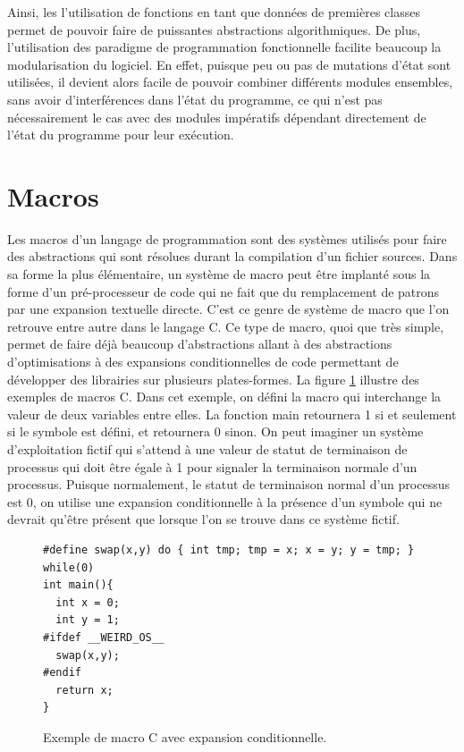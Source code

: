 \documentclass[12pt,oneside,letterpaper,francais]{book}
\newcommand{\scheme}[1]{\selectlanguage{english}{\tt #1}\selectlanguage{french}}
\begin{document}
Ainsi, les l'utilisation de fonctions en tant que données de premières
classes permet de pouvoir faire de puissantes abstractions
algorithmiques. De plus, l'utilisation des paradigme de programmation
fonctionnelle facilite beaucoup la modularisation du logiciel. En
effet, puisque peu ou pas de mutations d'état sont utilisées, il
devient alors facile de pouvoir combiner différents modules ensembles,
sans avoir d'interférences dans l'état du programme, ce qui n'est pas
nécessairement le cas avec des modules impératifs dépendant
directement de l'état du programme pour leur exécution.


\section{Macros}
\label{Scheme:macros}

Les macros d'un langage de programmation sont des systèmes utilisés
pour faire des abstractions qui sont résolues durant la compilation
d'un fichier sources. Dans sa forme la plus élémentaire, un système de
macro peut être implanté sous la forme d'un pré-processeur de code qui
ne fait que du remplacement de patrons par une expansion textuelle
directe. C'est ce genre de système de macro que l'on retrouve entre
autre dans le langage C. Ce type de macro, quoi que très simple,
permet de faire déjà beaucoup d'abstractions allant à des abstractions
d'optimisations à des expansions conditionnelles de code permettant de
développer des librairies sur plusieurs plates-formes. La figure
\ref{Scheme:c-macros} illustre des exemples de macros C. Dans cet
exemple, on défini la macro \scheme{swap} qui interchange la valeur de
deux variables entre elles. La fonction main retournera 1 si et
seulement si le symbole \scheme{\_\_WEIRD\_OS\_\_} est défini, et
retournera 0 sinon. On peut imaginer un système d'exploitation fictif
qui s'attend à une valeur de statut de terminaison de processus qui
doit être égale à 1 pour signaler la terminaison normale d'un
processus. Puisque normalement, le statut de terminaison normal d'un
processus est 0, on utilise une expansion conditionnelle à la présence
d'un symbole qui ne devrait qu'être présent que lorsque l'on se trouve
dans ce système fictif.\\

\begin{figure}[htb!]
  \begin{verbatim}
#define swap(x,y) do { int tmp; tmp = x; x = y; y = tmp; } while(0)
int main(){
  int x = 0;
  int y = 1;
#ifdef __WEIRD_OS__
  swap(x,y);
#endif
  return x;
}
  \end{verbatim}
  \caption{Exemple de macro C avec expansion conditionnelle.}
  \label{Scheme:c-macros}
\end{figure}
\end{document}
